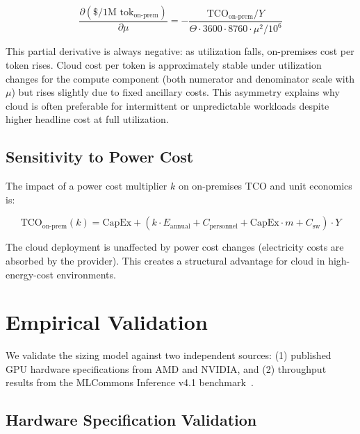 \documentclass{article}
\begin{document}
\begin{equation}
  \frac{\partial(\$/\text{1M tok}_{\text{on-prem}})}{\partial \mu} =
    -\frac{\text{TCO}_{\text{on-prem}} / Y}
    {\Theta \cdot 3600 \cdot 8760 \cdot \mu^2 / 10^6}
  \label{eq:utilization_sensitivity}
\end{equation}

This partial derivative is always negative: as utilization falls, on-premises
cost per token rises. Cloud cost per token is approximately stable under
utilization changes for the compute component (both numerator and denominator
scale with $\mu$) but rises slightly due to fixed ancillary costs.
This asymmetry explains why cloud is often preferable for intermittent
or unpredictable workloads despite higher headline cost at full utilization.

\subsection{Sensitivity to Power Cost}
\label{sec:power_sensitivity}

The impact of a power cost multiplier $k$ on on-premises TCO and unit
economics is:

\begin{equation}
  \text{TCO}_{\text{on-prem}}(k) = \text{CapEx} +
    (k \cdot E_{\text{annual}} + C_{\text{personnel}} + \text{CapEx} \cdot m
     + C_{\text{sw}}) \cdot Y
  \label{eq:power_sensitivity}
\end{equation}

The cloud deployment is unaffected by power cost changes (electricity costs
are absorbed by the provider). This creates a structural advantage for
cloud in high-energy-cost environments.

\section{Empirical Validation}
\label{sec:validation}

We validate the sizing model against two independent sources: (1) published
GPU hardware specifications from AMD and NVIDIA, and (2) throughput results
from the MLCommons Inference v4.1 benchmark~\cite{mlcommons2024}.

\subsection{Hardware Specification Validation}
\label{sec:hw_validation}
\end{document}
